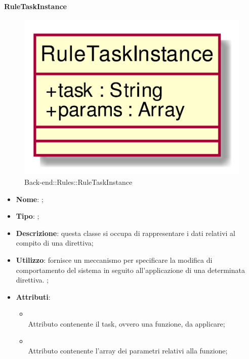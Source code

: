 \hypertarget{RuleTaskInstance_label}{\paragraph{RuleTaskInstance}}
\begin{figure}[h]
	\centering
	\includegraphics[width=\textwidth,height=\textheight,keepaspectratio]{images/ClassRuleTaskInstance.png}
	\caption{Back-end::Rules::RuleTaskInstance}
\end{figure}
\begin{itemize}
	\item \textbf{Nome}: ;
	\item \textbf{Tipo}: ;
	\item \textbf{Descrizione}: questa classe si occupa di rappresentare i dati relativi al compito di una direttiva;
	\item \textbf{Utilizzo}: fornisce un meccanismo per specificare la modifica di comportamento del sistema in seguito all'applicazione di una determinata direttiva. ;
	\item \textbf{Attributi}:
	\begin{itemize}
		\item[]  \\
		Attributo contenente il task, ovvero una funzione, da applicare;
		\item[]  \\
		Attributo contenente l'array dei parametri relativi alla funzione;
	\end{itemize}
\end{itemize}

